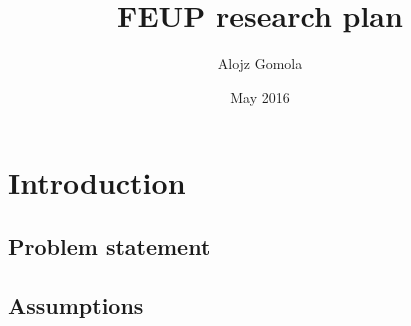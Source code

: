 \documentclass[12pt, a4paper]{report}
\title{FEUP research plan}
\author{Alojz Gomola}
\date{May 2016}
\theoremstyle{plain}
\theoremstyle{plain}
\theoremstyle{remark}
\begin{document}


\chapter{Introduction}

\section{Problem statement}
\section{Assumptions}

\end{document}
